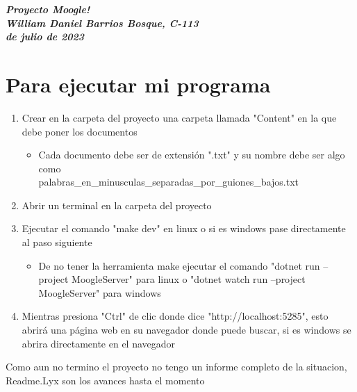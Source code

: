 \documentclass{article}
\begin{document}
\begin{titlepage}
  \begin{center}
    \huge
    \itshape\bfseries
    Proyecto Moogle!\\
    \medskip
    William Daniel Barrios Bosque, C-113\\
     de julio de 2023\\
  \end{center}
\end{titlepage}

\tableofcontents

\section{Para ejecutar mi programa}
  \begin{enumerate}
    \item Crear en la carpeta del proyecto una carpeta llamada "Content" en la que debe poner los documentos
      \begin{itemize}
        \renewcommand{\labelitemi}{$\diamond$}
        \item Cada documento debe ser de extensión ".txt" y su nombre debe ser algo como\\
        palabras\_en\_minusculas\_separadas\_por\_guiones\_bajos.txt
      \end{itemize} 
    \item Abrir un terminal en la carpeta del proyecto
    \item Ejecutar el comando "make dev" en linux o si es windows pase directamente al paso siguiente
      \begin{itemize}
        \renewcommand{\labelitemi}{$\diamond$}
        \item De no tener la herramienta make ejecutar el comando "dotnet run --project MoogleServer" para linux o "dotnet watch run --project MoogleServer" para windows
      \end{itemize}
    \item Mientras presiona "Ctrl" de clic donde dice "http://localhost:5285", esto abrirá una página web en su navegador donde puede buscar, si es windows se abrira directamente en el navegador
  \end{enumerate}
\begin{center}
\end{center}
 
 \begin{frame}
 \item Como aun no termino el proyecto no tengo un informe completo de la situacion, Readme.Lyx son los avances hasta el momento
 \end{frame}
\end{document}
